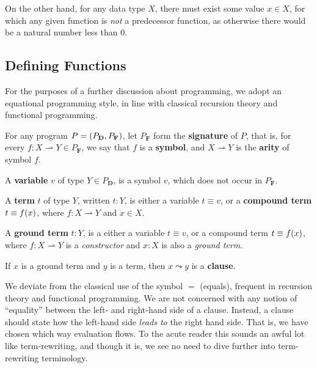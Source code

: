 On the other hand, for any data type $X$, there must exist some value $x \in
X$, for which any given function is \emph{not} a predecessor function, as
otherwise there would be a natural number less than $0$.

\subsection{Defining Functions}

For the purposes of a further discussion about programming, we adopt an
equational programming style, in line with classical recursion theory and
functional programming.

\begin{definition} For any program $P = {\mathopen{}\left({P_\mathbf{D}, P_\mathbf{F}}\right)\mathclose{}}$, let
$P_\mathbf{F}$ form the \textbf{signature} of $P$, that is, for every $f : X
\rightharpoonup Y \in P_\mathbf{F}$, we say that $f$ is a \textbf{symbol}, and
$X \rightharpoonup Y$ is the \textbf{arity} of symbol $f$. \end{definition}

\begin{definition} A \textbf{variable} $v$ of type $Y \in P_\mathbf{D}$, is a
symbol $v$, which does not occur in $P_\mathbf{F}$. \end{definition}

\begin{definition} A \textbf{term} $t$ of type $Y$, written $t : Y$, is either
a variable $t \equiv v$, or a \textbf{compound term} $t \equiv f{\mathopen{}\left({x}\right)\mathclose{}}$, where
$f : X \rightharpoonup Y$ and $x \in X$. \end{definition} 

\begin{definition} A \textbf{ground term} $t : Y$, is a either a variable $t
\equiv v$, or a compound term $t \equiv f{\mathopen{}\left({x}\right)\mathclose{}}$, where $f : X \rightharpoonup
Y$ is a \emph{constructor} and $x : X$ is also a \emph{ground term}.
\end{definition}

\begin{definition} If $x$ is a ground term and $y$ is a term, then $x \leadsto
y$ is a \textbf{clause}.  \end{definition}

\begin{remark} We deviate from the classical use of the symbol $=$ (equals),
frequent in recursion theory and functional programming. We are not concerned
with any notion of ``equality'' between the left- and right-hand side of a
clause. Instead, a clause should state how the left-hand side \emph{leads to}
the right hand side. That is, we have chosen which way evaluation flows. To the
acute reader this sounds an awful lot like term-rewriting, and though it is, we
see no need to dive further into term-rewriting terminology. \end{remark}

